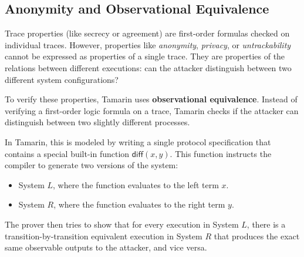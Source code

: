 \subsection{Anonymity and Observational Equivalence}

Trace properties (like secrecy or agreement) are first-order formulas checked on individual traces. However, properties like \emph{anonymity}, \emph{privacy}, or \emph{untrackability} cannot be expressed as properties of a single trace. They are properties of the relations between different executions: can the attacker distinguish between two different system configurations?

To verify these properties, Tamarin uses \textbf{observational equivalence}. Instead of verifying a first-order logic formula on a trace, Tamarin checks if the attacker can distinguish between two slightly different processes.

In Tamarin, this is modeled by writing a single protocol specification that contains a special built-in function $\mathsf{diff}(x, y)$. This function instructs the compiler to generate two versions of the system:
\begin{itemize}
  \item System $L$, where the function evaluates to the left term $x$.
  \item System $R$, where the function evaluates to the right term $y$.
\end{itemize}
The prover then tries to show that for every execution in System $L$, there is a transition-by-transition equivalent execution in System $R$ that produces the exact same observable outputs to the attacker, and vice versa.

